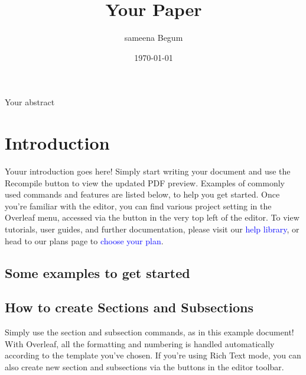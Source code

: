 \documentclass{article} %
\title{Your Paper}
\author{sameena Begum}
\date{\today}
\begin{document}
\maketitle
Your abstract\section{Introduction}
Youur introduction goes here! Simply start writing your document and use the Recompile button to
view the updated PDF preview. Examples of commonly used commands and features are listed below,
to help you get started.
Once you’re familiar with the editor, you can find various project setting in the Overleaf menu,
accessed via the button in the very top left of the editor. To view tutorials, user guides, and further
documentation, please visit our \textcolor{blue}{help library}, or head to our plans page to \textcolor{blue}{choose your plan}.
\subsection{ Some examples to get started}
\subsection{How to create Sections and Subsections}
Simply use the section and subsection commands, as in this example document! With Overleaf, all
the formatting and numbering is handled automatically according to the template you’ve chosen. If
you’re using Rich Text mode, you can also create new section and subsections via the buttons in the editor toolbar.
\end{document}
